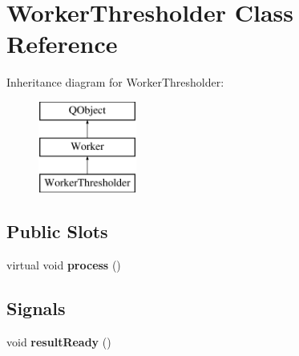 \hypertarget{classWorkerThresholder}{}\section{Worker\+Thresholder Class Reference}
\label{classWorkerThresholder}
Inheritance diagram for Worker\+Thresholder\+:\begin{figure}[H]
\begin{center}
\leavevmode
\includegraphics[height=3.000000cm]{classWorkerThresholder}
\end{center}
\end{figure}
\subsection*{Public Slots}
\begin{DoxyCompactItemize}
\item 
\mbox{\label{classWorkerThresholder_a22be27a9baa201b1da78bd320f0611e4}} 
virtual void {\bfseries process} ()
\end{DoxyCompactItemize}
\subsection*{Signals}
\begin{DoxyCompactItemize}
\item 
\mbox{\label{classWorker_a95f9f660a4f74f24ae5b8470fa1e4050}} 
void {\bfseries result\+Ready} ()
\end{DoxyCompactItemize}
